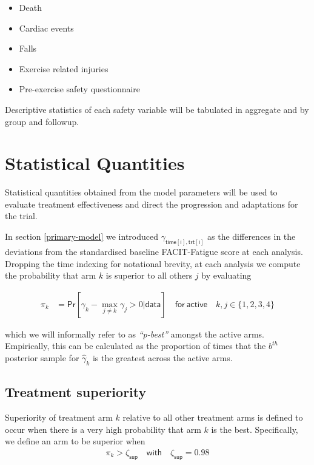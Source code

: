 \documentclass[
]{article}
\begin{document}
\begin{itemize}
  \item Death
  \item Cardiac events
  \item Falls
  \item Exercise related injuries
  \item Pre-exercise safety questionnaire
\end{itemize}

Descriptive statistics of each safety variable will be tabulated in aggregate and by group and followup.

\clearpage

\hypertarget{statistical-quantities}{%
  \section{Statistical Quantities}\label{statistical-quantities}}

Statistical quantities obtained from the model parameters will be used to evaluate treatment effectiveness and direct the progression and adaptations for the trial.

In section \ref{primary-model} we introduced $\gamma_{\mathsf{time[i], trt[i]}}$ as the differences in the deviations from the standardised baseline FACIT-Fatigue score at each analysis.
Dropping the time indexing for notational brevity, at each analysis we compute the probability that arm $k$ is superior to all others $j$ by evaluating

\[
  \begin{aligned}
    \pi_{k} & = \mathsf{Pr}[\gamma_{k} - \max_{j\ne k} \gamma_j >0|\mathsf{data}] \quad \mathsf{for \  active} \quad k,j \in \{1, 2, 3, 4\}
  \end{aligned}
\]

which we will informally refer to as \textit{``p-best''} amongst the active arms.
Empirically, this can be calculated as the proportion of times that the $b^{th}$ posterior sample for $\widehat{\gamma}_k$ is the greatest across the active arms.

\hypertarget{treatment-superiority}{%
  \subsection{Treatment superiority}\label{treatment-superiority}}

Superiority of treatment arm $k$ relative to all other treatment arms is defined to occur when there is a very high probability that arm $k$ is the best.
Specifically, we define an arm to be superior when
\[
  \begin{aligned}
    \pi_{k} > \zeta_{\mathsf{sup}} \quad \mathsf{with} \quad \zeta_{\mathsf{sup}} = 0.98
  \end{aligned}
\]
\end{document}
